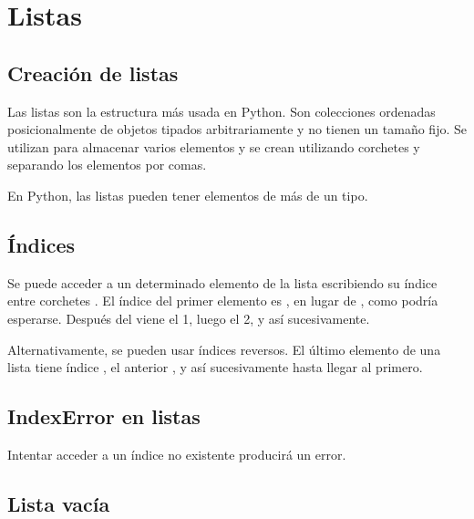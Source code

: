 \chapter{Listas}

\section{Creación de listas}

Las listas son la estructura más usada en Python.
Son colecciones ordenadas posicionalmente de objetos tipados arbitrariamente y no tienen un tamaño fijo.
Se utilizan para almacenar varios elementos y se crean utilizando corchetes y separando los elementos por comas.


En Python, las listas pueden tener elementos de más de un tipo.


\section{Índices}

Se puede acceder a un determinado elemento de la lista escribiendo su índice entre corchetes \ttt{[]}.
El índice del primer elemento es , en lugar de , como podría esperarse.
Después del  viene el {1}, luego el {2}, y así sucesivamente.


Alternativamente, se pueden usar índices reversos.
El último elemento de una lista tiene índice , el anterior , y así sucesivamente hasta llegar al primero.


\section{IndexError en listas}

Intentar acceder a un índice no existente producirá un error.


\section{Lista vacía}

